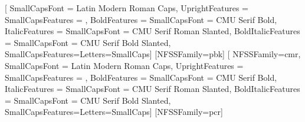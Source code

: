 \setmainfont{Latin Modern Roman}[
  SmallCapsFont = Latin Modern Roman Caps,
  UprightFeatures = {SmallCapsFeatures = {}}, %
  BoldFeatures = {SmallCapsFont = {CMU Serif Bold}},
  ItalicFeatures = {SmallCapsFont = {CMU Serif Roman Slanted}},
  BoldItalicFeatures = {SmallCapsFont = {CMU Serif Bold Slanted}},
  SmallCapsFeatures={Letters=SmallCaps}]
[NFSSFamily=pbk]
[
  NFSSFamily=cmr,
  SmallCapsFont = Latin Modern Roman Caps,
  UprightFeatures = {SmallCapsFeatures = {}}, %
  BoldFeatures = {SmallCapsFont = {CMU Serif Bold}},
  ItalicFeatures = {SmallCapsFont = {CMU Serif Roman Slanted}},
  BoldItalicFeatures = {SmallCapsFont = {CMU Serif Bold Slanted}},
  SmallCapsFeatures={Letters=SmallCaps}]
[NFSSFamily=pcr]
\setmonofont{Latin Modern Mono}

\newfontfamily{}
\DeclareTextFontCommand{\textttpit}{\ttprop\itshape}
\DeclareTextFontCommand{\textttp}{\ttprop}




\newtheorem{theorem}{Theorem}[chapter]
\newtheorem{corollary}{Corollary}[theorem]
\newtheorem{lemma}[theorem]{Lemma}

\theoremstyle{definition}
\newtheorem{definition}{Definition}[chapter]

\theoremstyle{remark}
\newtheorem*{remark}{Remark}


{}%
{}%
{\normalfont}%
{}%
{\bfseries}%
{}%
{\newline}%
{ }%

